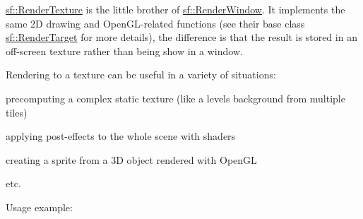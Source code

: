 \begin{DoxyVerb}\end{DoxyVerb}


\mbox{\hyperlink{classsf_1_1_render_texture}{sf\+::\+Render\+Texture}} is the little brother of \mbox{\hyperlink{classsf_1_1_render_window}{sf\+::\+Render\+Window}}. It implements the same 2D drawing and Open\+G\+L-\/related functions (see their base class \mbox{\hyperlink{classsf_1_1_render_target}{sf\+::\+Render\+Target}} for more details), the difference is that the result is stored in an off-\/screen texture rather than being show in a window.

Rendering to a texture can be useful in a variety of situations\+: \begin{DoxyItemize}
\item precomputing a complex static texture (like a level\textquotesingle{}s background from multiple tiles) \item applying post-\/effects to the whole scene with shaders \item creating a sprite from a 3D object rendered with Open\+GL \item etc.\end{DoxyItemize}
Usage example\+:


